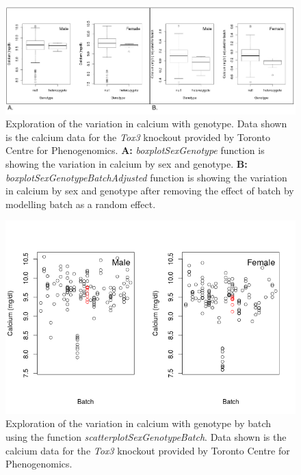 \documentclass[12pt,a4paper]{article}
\begin{document}
\begin{figure}[!htpb]%
\centerline{\includegraphics[scale=0.4]{boxplotsBatchEffect.png}}
\caption{Exploration of the variation in calcium with genotype. Data shown is the calcium data for the \textit{Tox3} knockout provided by Toronto Centre for Phenogenomics.
\textbf{A:} \textit{boxplotSexGenotype} function is showing the variation in calcium by sex and genotype. 
\textbf{B:} \textit{boxplotSexGenotypeBatchAdjusted} function is showing the variation in calcium by sex and genotype after removing the effect of batch by modelling batch as a random effect.}\label{fig:09a}
\end{figure}

\begin{figure}[!htpb]%
\centerline{\includegraphics[scale=0.4]{scatterplotBatchEffect.png}}
\caption{Exploration of the variation in calcium with genotype by batch using the function \textit{scatterplotSexGenotypeBatch}. Data shown is the calcium data for the \textit{Tox3} knockout provided by Toronto Centre for Phenogenomics.}\label{fig:09b}
\end{figure}
\end{document}
